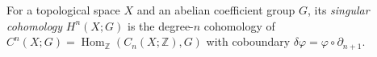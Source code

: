 
For a topological space $X$ and an abelian coefficient group $G$, its \emph{singular cohomology} $H^n(X;G)$ is the degree-$n$ cohomology of $C^n(X;G)=\operatorname{Hom}_{\mathbb Z}(C_n(X;\mathbb Z),G)$ with coboundary $\delta\varphi=\varphi\circ\partial_{n+1}$.
